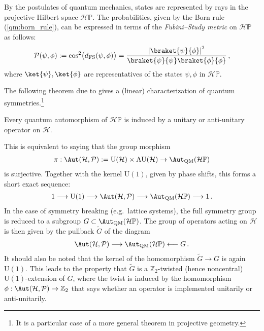     \begin{property}[States]
        By the postulates of quantum mechanics, states are represented by rays in the projective Hilbert space $\mathcal{H}\mathbb{P}$. The probabilities, given by the Born rule (\cref{qm:born_rule}), can be expressed in terms of the \textit{Fubini--Study metric} on $\mathcal{H}\mathbb{P}$ as follows:
        \begin{gather}
            \mathcal{P}(\psi,\phi) := \cos^2\bigl(d_{\text{FS}}(\psi,\phi)\bigr) = \frac{\left|\braket{\psi}{\phi}\right|^2}{\braket{\psi}{\psi}\braket{\phi}{\phi}}\,,
        \end{gather}
        where $\ket{\psi},\ket{\phi}$ are representatives of the states $\psi,\phi$ in $\mathcal{H}\mathbb{P}$.
    \end{property}


    The following theorem due to  gives a (linear) characterization of quantum symmetries.\footnote{It is a particular case of a more general theorem in projective geometry.}
    \begin{theorem}[Wigner]
        Every quantum automorphism of $\mathcal{H}\mathbb{P}$ is induced by a unitary or anti-unitary operator on $\mathcal{H}$.
    \end{theorem}
    This is equivalent to saying that the group morphism
    \begin{gather}
        \pi:\Aut(\mathcal{H},\mathcal{P}):=\mathrm{U}(\mathcal{H})\times\mathrm{AU}(\mathcal{H})\rightarrow\Aut_{\text{QM}}(\mathcal{H}\mathbb{P})
    \end{gather}
    is surjective. Together with the kernel $\mathrm{U}(1)$, given by phase shifts, this forms a short exact sequence:
    \begin{gather}
        1\longrightarrow\mathrm{U}(1)\longrightarrow\Aut(\mathcal{H},\mathcal{P})\longrightarrow\Aut_{\text{QM}}(\mathcal{H}\mathbb{P})\longrightarrow1\,.
    \end{gather}
    In the case of symmetry breaking (e.g.~lattice systems), the full symmetry group is reduced to a subgroup $G\subset\Aut_{\text{QM}}(\mathcal{H}\mathbb{P})$. The group of operators acting on $\mathcal{H}$ is then given by the pullback $\widetilde{G}$ of the diagram
    \begin{gather}
        \Aut(\mathcal{H},\mathcal{P})\longrightarrow\Aut_{\text{QM}}(\mathcal{H}\mathbb{P})\longleftarrow G\,.
    \end{gather}
    It should also be noted that the kernel of the homomorphism $\widetilde{G}\rightarrow G$ is again $\mathrm{U}(1)$. This leads to the property that $\widetilde{G}$ is a $\mathbb{Z}_2$-twisted (hence noncentral) $\mathrm{U}(1)$-extension of $G$, where the twist is induced by the homomorphism $\phi:\Aut(\mathcal{H},\mathcal{P})\rightarrow\mathbb{Z}_2$ that says whether an operator is implemented unitarily or anti-unitarily.

